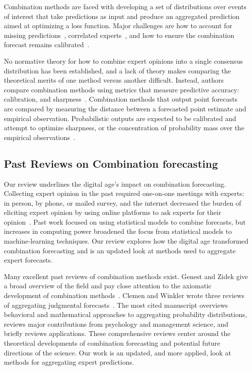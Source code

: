 \documentclass[preprint,authoryear,nonatbib]{elsarticle}
\begin{document}
Combination methods are faced with developing a set of distributions over events of interest that take predictions as input and produce an aggregated prediction aimed at optimizing a loss function. 
Major challenges are how to account for missing predictions~\parencite{capistran2009forecast}, correlated experts~\parencite{armstrong1985long,bunn1985statistical,bunn1979synthesis}, and how to ensure the combination forecast remains calibrated~\parencite{ranjan2010combining,gneiting2013combining,berrocal2007combining,glahn2009mos,kleiber2011locally,garratt2019empirically}.

No normative theory for how to combine expert opinions into a single consensus distribution has been established, and a lack of theory makes comparing the theoretical merits of one method versus another difficult. 
Instead, authors compare combination methods using metrics that measure predictive accuracy: calibration, and sharpness~\parencite{jolliffe2012forecast,gneiting2007strictly,gneiting2011comparing,dawid2007geometry,hora2015calibration}.
Combination methods that output point forecasts are compared by measuring the distance between a forecasted point estimate and empirical observation.
Probabilistic outputs are expected to be calibrated and attempt to optimize sharpness, or the concentration of probability mass over the empirical observations~\parencite{gneiting2007strictly,gneiting2011comparing,hora2015calibration,jolliffe2012forecast}.

\subsection{Past Reviews on Combination forecasting}

Our review underlines the digital age's impact on combination forecasting.
Collecting expert opinion in the past required one-on-one meetings with experts: in person, by phone, or mailed survey, and the internet decreased the burden of eliciting expert opinion by using online platforms to ask experts for their opinion~\parencite{howe2006rise}.
Past work focused on using statistical models to combine forecasts, but increases in computing power broadened the focus from statistical models to machine-learning techniques.
Our review explores how the digital age transformed combination forecasting and is an updated look at methods used to aggregate expert forecasts. 

Many excellent past reviews of combination methods exist.
Genest and Zidek give a broad overview of the field and pay close attention to the axiomatic development of combination methods~\parencite{genest1986combining}.
Clemen and Winkler wrote three reviews of aggregating judgmental forecasts~\parencite{clemen1986combining, clemen1989combining, clemen1999combining}.
The most cited manuscript overviews behavioral and mathematical approaches to aggregating probability distributions, reviews major contributions from psychology and management science, and briefly reviews applications.
These comprehensive reviews center around the theoretical developments of combination forecasting and potential future directions of the science.
Our work is an updated, and more applied, look at methods for aggregating expert predictions.
\end{document}
